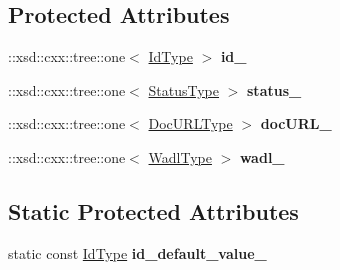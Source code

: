 \subsection*{Protected Attributes}
\begin{DoxyCompactItemize}
\item 
\hypertarget{classopenstack_1_1xml_1_1Version_a2960877b7c2cc5cd6eab0af918e06078}{
::xsd::cxx::tree::one$<$ \hyperlink{classopenstack_1_1xml_1_1Version_adc25fd51942519ad4a73a8b0618f3dd0}{IdType} $>$ {\bfseries id\_\-}}
\label{classopenstack_1_1xml_1_1Version_a2960877b7c2cc5cd6eab0af918e06078}

\item 
\hypertarget{classopenstack_1_1xml_1_1Version_a837434ee2f446728d3d30be07b28b5f0}{
::xsd::cxx::tree::one$<$ \hyperlink{classopenstack_1_1xml_1_1VersionStatus}{StatusType} $>$ {\bfseries status\_\-}}
\label{classopenstack_1_1xml_1_1Version_a837434ee2f446728d3d30be07b28b5f0}

\item 
\hypertarget{classopenstack_1_1xml_1_1Version_aa5833c52ba418e80c4f07f724961ab24}{
::xsd::cxx::tree::one$<$ \hyperlink{classopenstack_1_1xml_1_1Version_aed74beb6af9dc70c3ec21ba445627cec}{DocURLType} $>$ {\bfseries docURL\_\-}}
\label{classopenstack_1_1xml_1_1Version_aa5833c52ba418e80c4f07f724961ab24}

\item 
\hypertarget{classopenstack_1_1xml_1_1Version_a8445391f3f32e956e016a8b8128e419c}{
::xsd::cxx::tree::one$<$ \hyperlink{classopenstack_1_1xml_1_1Version_a5a0dce1b88ef63c4fd363ef4f2754a79}{WadlType} $>$ {\bfseries wadl\_\-}}
\label{classopenstack_1_1xml_1_1Version_a8445391f3f32e956e016a8b8128e419c}

\end{DoxyCompactItemize}
\subsection*{Static Protected Attributes}
\begin{DoxyCompactItemize}
\item 
\hypertarget{classopenstack_1_1xml_1_1Version_a4772f8bee4eda78f7a885c5829ac8b3a}{
static const \hyperlink{classopenstack_1_1xml_1_1Version_adc25fd51942519ad4a73a8b0618f3dd0}{IdType} {\bfseries id\_\-default\_\-value\_\-}}
\label{classopenstack_1_1xml_1_1Version_a4772f8bee4eda78f7a885c5829ac8b3a}

\end{DoxyCompactItemize}
